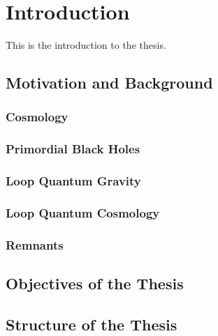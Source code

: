 \chapter{Introduction}
This is the introduction to the thesis.\cite{pdg}
\section{Motivation and Background}
\subsection{Cosmology}
\subsection{Primordial Black Holes}
\subsection{Loop Quantum Gravity}
\subsection{Loop Quantum Cosmology}
\subsection{Remnants}

\section{Objectives of the Thesis}

\section{Structure of the Thesis}
